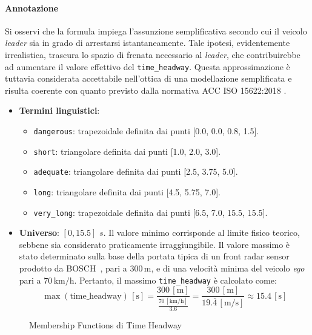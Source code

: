 \paragraph{Annotazione} Si osservi che la formula impiega l'assunzione semplificativa 
secondo cui il veicolo \emph{leader} sia in grado di arrestarsi istantaneamente. 
Tale ipotesi, evidentemente irrealistica, trascura lo spazio di frenata necessario al \emph{leader}, 
che contribuirebbe ad aumentare il valore effettivo del \texttt{time\_headway}. Questa approssimazione 
è tuttavia considerata accettabile nell'ottica di una modellazione semplificata e risulta coerente con quanto 
previsto dalla normativa ACC ISO 15622:2018 \cite{iso15622}.

\begin{itemize}
  \item \textbf{Termini linguistici}:
    \begin{itemize}
      \item \texttt{dangerous}: trapezoidale definita dai punti [0.0, 0.0, 0.8, 1.5].
      \item \texttt{short}: triangolare definita dai punti [1.0, 2.0, 3.0].
      \item \texttt{adequate}: triangolare definita dai punti [2.5, 3.75, 5.0].
      \item \texttt{long}: triangolare definita dai punti [4.5, 5.75, 7.0].
      \item \texttt{very\_long}: trapezoidale definita dai punti [6.5, 7.0, 15.5, 15.5].
    \end{itemize}
  \item \textbf{Universo}: \([0,15.5]\) $s$.  
        Il valore minimo corrisponde al limite fisico teorico, sebbene sia considerato praticamente irraggiungibile.
        Il valore massimo è stato determinato sulla base della portata tipica di un front radar sensor prodotto da BOSCH~\cite{bosch_radar}, pari a \(300\,\mathrm{m}\), e di una velocità minima del veicolo \emph{ego} pari a \(70\,\mathrm{km/h}\).  
        Pertanto, il massimo \texttt{time\_headway} è calcolato come:
        \[
            \max(\text{time\_headway})\,[\mathrm{s}] =
            \frac{300 \,[\mathrm{m}]}{\frac{70\,[\mathrm{km}/\mathrm{h}]}{3.6}} = 
            \frac{300 \,[\mathrm{m}]}{19.\overline{4}\,[\mathrm{m}/\mathrm{s}]}
            \approx 15.4\,[\mathrm{s}]
        \]
\end{itemize}

\begin{figure}[H]
    \centering
    \caption{Membership Functions di Time Headway}
    \label{Fig:mf_time_headway}
\end{figure}

